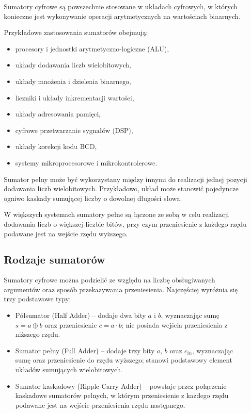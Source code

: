 \documentclass[12pt,a4paper]{article}
\begin{document}
Sumatory cyfrowe są powszechnie stosowane w układach cyfrowych, w których konieczne jest wykonywanie operacji arytmetycznych na wartościach binarnych.

Przykładowe zastosowania sumatorów obejmują:
\begin{itemize}
    \item procesory i jednostki arytmetyczno-logiczne (ALU),
    \item układy dodawania liczb wielobitowych,
    \item układy mnożenia i dzielenia binarnego,
    \item liczniki i układy inkrementacji wartości,
    \item układy adresowania pamięci,
    \item cyfrowe przetwarzanie sygnałów (DSP),
    \item układy korekcji kodu BCD,
    \item systemy mikroprocesorowe i mikrokontrolerowe.
\end{itemize}

Sumator pełny może być wykorzystany między innymi do realizacji jednej pozycji dodawania liczb wielobitowych. Przykładowo, układ może stanowić pojedyncze ogniwo kaskady sumującej liczby o dowolnej długości słowa.

W większych systemach sumatory pełne są łączone ze sobą w celu realizacji dodawania liczb o większej liczbie bitów, przy czym przeniesienie z każdego rzędu podawane jest na wejście rzędu wyższego.

\subsection{Rodzaje sumatorów}

Sumatory cyfrowe można podzielić ze względu na liczbę obsługiwanych argumentów oraz sposób przekazywania przeniesienia. Najczęściej wyróżnia się trzy podstawowe typy:
\begin{itemize}
    \item Półsumator (Half Adder) -- dodaje dwa bity $a$ i $b$, wyznaczając sumę $s = a \oplus b$ oraz przeniesienie $c = a \cdot b$; nie posiada wejścia przeniesienia z niższego rzędu.
    \item Sumator pełny (Full Adder) -- dodaje trzy bity $a$, $b$ oraz $c_{in}$, wyznaczając sumę oraz przeniesienie do rzędu wyższego; stanowi podstawowy element układów sumujących wielobitowych.
    \item Sumator kaskadowy (Ripple-Carry Adder) -- powstaje przez połączenie kaskadowe sumatorów pełnych, w którym przeniesienie z każdego rzędu podawane jest na wejście przeniesienia rzędu następnego.
\end{itemize}
\end{document}
